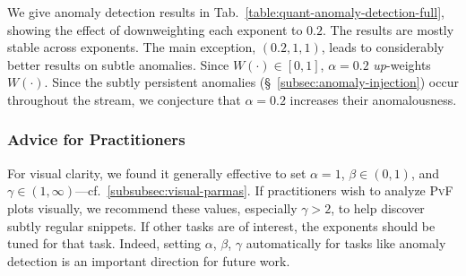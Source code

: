 \documentclass[sigconf]{acmart}
\newcommand{\pf}{\textsc{PvF}\xspace}
\newcommand{\width}{W}
\newcommand{\wExp}{\alpha}
\newcommand{\fExp}{\beta}
\newcommand{\sExp}{\gamma}
\begin{document}
\begin{table}[t]
\centering
	\caption{Additional results at identifying subtly persistent and bursty anomalies, showing the effect of parameters ($\wExp, \fExp, \sExp$).
    }
	\vspace{-0.35cm}
	\label{table:quant-anomaly-detection-full}
\end{table}

We give anomaly detection results in Tab.~\ref{table:quant-anomaly-detection-full}, showing the effect of downweighting each exponent to $0.2$. The results are mostly stable across exponents. The main exception, $(0.2, 1, 1)$, leads to considerably better results on subtle anomalies. Since $\width(\cdot) \in [0,1]$, $\wExp = 0.2$ \emph{up}-weights $\width(\cdot)$. Since the subtly persistent anomalies (\S~\ref{subsec:anomaly-injection}) occur throughout the stream, we conjecture that $\wExp = 0.2$ increases their anomalousness.

\subsubsection{Advice for Practitioners}
{For visual clarity, we found it generally effective to set $\wExp = 1$, $\fExp \in (0, 1)$, and $\sExp \in (1, \infty)$---cf.~\ref{subsubsec:visual-parmas}. If practitioners wish to analyze \pf plots visually, we recommend these values, especially $\sExp > 2$, to help discover subtly regular snippets. 
If other tasks are of interest, the exponents should be tuned for that task. Indeed, setting $\wExp$, $\fExp$, $\sExp$ automatically for tasks like anomaly detection is an important direction for future work.}
\end{document}
